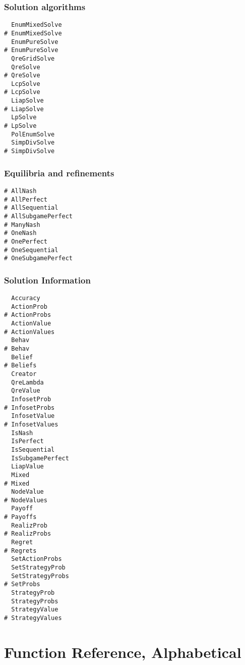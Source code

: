 \subsection{Solution algorithms}

\begin{multicols}{3}
\begin{verbatim}
  EnumMixedSolve 
# EnumMixedSolve 
  EnumPureSolve 
# EnumPureSolve 
  QreGridSolve 
  QreSolve 
# QreSolve 
  LcpSolve 
# LcpSolve 
  LiapSolve 
# LiapSolve 
  LpSolve 
# LpSolve 
  PolEnumSolve
  SimpDivSolve 
# SimpDivSolve 
\end{verbatim}
\end{multicols}

\subsection{Equilibria and refinements}

\begin{multicols}{3}
\begin{verbatim}
# AllNash
# AllPerfect
# AllSequential 
# AllSubgamePerfect
# ManyNash
# OneNash
# OnePerfect
# OneSequential
# OneSubgamePerfect
\end{verbatim}
\end{multicols}

\subsection{Solution Information}

\begin{multicols}{3}
\begin{verbatim}
  Accuracy
  ActionProb 
# ActionProbs 
  ActionValue 
# ActionValues 
  Behav 
# Behav 
  Belief 
# Beliefs 
  Creator
  QreLambda 
  QreValue 
  InfosetProb 
# InfosetProbs 
  InfosetValue 
# InfosetValues 
  IsNash 
  IsPerfect 
  IsSequential 
  IsSubgamePerfect 
  LiapValue 
  Mixed
# Mixed
  NodeValue 
# NodeValues 
  Payoff 
# Payoffs 
  RealizProb 
# RealizProbs 
  Regret
# Regrets
  SetActionProbs 
  SetStrategyProb 
  SetStrategyProbs 
# SetProbs
  StrategyProb 
  StrategyProbs
  StrategyValue 
# StrategyValues 
\end{verbatim}
\end{multicols}

\chapter{Function Reference, Alphabetical}
\pagestyle{lexicon}

